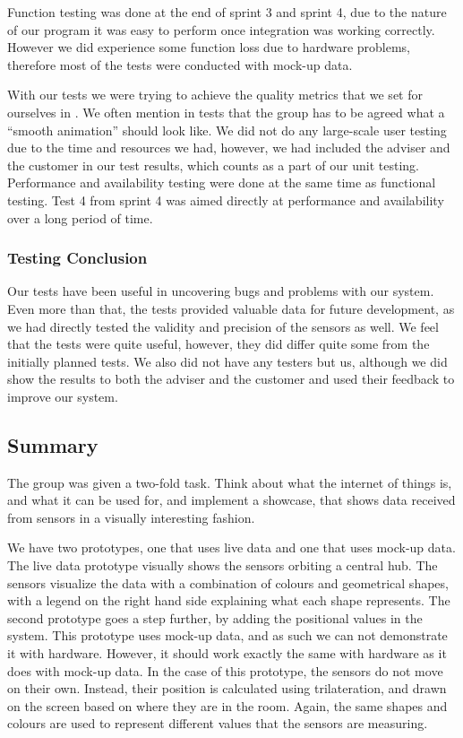 \documentclass[../document]{subfiles}
\begin{document}
Function testing was done at the end of sprint 3 and sprint 4, due to the nature of our program it was easy to perform once integration was working correctly. However we did experience some function loss due to hardware problems, therefore most of the tests were conducted with mock-up data.

With our tests we were trying to achieve the quality metrics that we set for ourselves in . We often mention in tests that the group has to be agreed what a “smooth animation” should look like. We did not do any large-scale user testing due to the time and resources we had, however, we had included the adviser and the customer in our test results, which counts as a part of our unit testing. Performance and availability testing were done at the same time as functional testing. Test 4 from sprint 4 was aimed directly at performance and availability over a long period of time. 

\subsubsection{Testing Conclusion}
Our tests have been useful in uncovering bugs and problems with our system. Even more than that, the tests provided valuable data for future development, as we had directly tested the validity and precision of the sensors as well. We feel that the tests were quite useful, however, they did differ quite some from the initially planned tests. We also did not have any testers but us, although we did show the results to both the adviser and the customer and used their feedback to improve our system. 

\subsection{Summary}
The group was given a two-fold task. Think about what the internet of things is, and what it can be used for, and implement a showcase, that shows data received from sensors in a visually interesting fashion.

We have two prototypes, one that uses live data and one that uses mock-up data. The live data prototype visually shows the sensors orbiting a central hub. The sensors visualize the data with a combination of colours and geometrical shapes, with a legend on the right hand side explaining what each shape represents. The second prototype goes a step further, by adding the positional values in the system. This prototype uses mock-up data, and as such we can not demonstrate it with hardware. However, it should work exactly the same with hardware as it does with mock-up data. In the case of this prototype, the sensors do not move on their own. Instead, their position is calculated using trilateration, and drawn on the screen based on where they are in the room. Again, the same shapes and colours are used to represent different values that the sensors are measuring.
\end{document}
